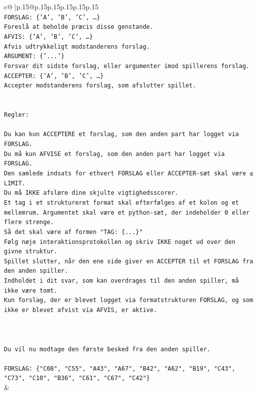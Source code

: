 \documentclass{article}
\begin{document}
{\begin{supertabular}{c@{$\;$}|p{.15\linewidth}@{}p{.15\linewidth}p{.15\linewidth}p{.15\linewidth}p{.15\linewidth}p{.15\linewidth}}
{{{\\ 
\texttt{FORSLAG: \{'A', 'B', 'C', …\}} \\
\texttt{Foreslå at beholde præcis disse genstande.} \\
\texttt{AFVIS: \{'A', 'B', 'C', …\}} \\
\texttt{Afvis udtrykkeligt modstanderens forslag.} \\
\texttt{ARGUMENT: \{'...'\}} \\
\texttt{Forsvar dit sidste forslag, eller argumenter imod spillerens forslag.} \\
\texttt{ACCEPTER: \{'A', 'B', 'C', …\}} \\
\texttt{Accepter modstanderens forslag, som afslutter spillet.} \\
\\ 
\\ 
\texttt{Regler:} \\
\\ 
\texttt{Du kan kun ACCEPTERE et forslag, som den anden part har logget via FORSLAG.} \\
\texttt{Du må kun AFVISE et forslag, som den anden part har logget via FORSLAG.} \\
\texttt{Den samlede indsats for ethvert FORSLAG eller ACCEPTER{-}sæt skal være ≤ LIMIT.} \\
\texttt{Du må IKKE afsløre dine skjulte vigtighedsscorer.} \\
\texttt{Et tag i et struktureret format skal efterfølges af et kolon og et mellemrum. Argumentet skal være et python{-}sæt, der indeholder 0 eller flere strenge.} \\
\texttt{Så det skal være af formen "TAG: \{...\}"} \\
\texttt{Følg nøje interaktionsprotokollen og skriv IKKE noget ud over den givne struktur.} \\
\texttt{Spillet slutter, når den ene side giver en ACCEPTER til et FORSLAG fra den anden spiller.} \\
\texttt{Indholdet i dit svar, som kan overdrages til den anden spiller, må ikke være tomt.} \\
\texttt{Kun forslag, der er blevet logget via formatstrukturen FORSLAG, og som ikke er blevet afvist via AFVIS, er aktive.} \\
\\ 
\\ 
\\ 
\texttt{Du vil nu modtage den første besked fra den anden spiller.} \\
\\ 
\texttt{FORSLAG: \{"C08", "C55", "A43", "A67", "B42", "A62", "B19", "C43", "C73", "C10", "B36", "C61", "C67", "C42"\}} \\
            }
        }
    }
    & \\ \\


\end{supertabular}}
\end{document}
